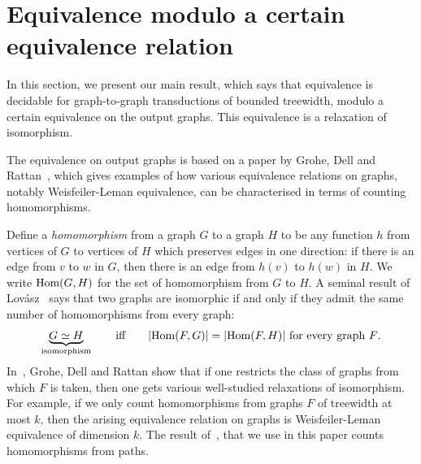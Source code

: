 
\section{Equivalence  modulo a certain equivalence relation}\label{sec:equivalence-modulo}
In this section, we present our main result, which says  that equivalence is decidable for graph-to-graph transductions of bounded treewidth, modulo a certain equivalence on the output graphs. This equivalence is a relaxation of isomorphism.  

 The equivalence on output graphs is based on a paper by Grohe, Dell and Rattan~\cite{groheDellRattan2018}, which gives examples of how various equivalence relations on graphs, notably Weisfeiler-Leman equivalence, can be characterised in terms of counting homomorphisms. 

Define a \emph{homomorphism} from a graph $G$ to a graph $H$ to be any function $h$ from vertices of $G$ to vertices of $H$ which preserves edges in one direction: if there is an edge from $v$ to $w$ in $G$, then there is an edge from $h(v)$ to $h(w)$ in $H$. We write $\mathrm {Hom}(G,H)$ for the set of homomorphism from $G$ to $H$. A seminal result of  Lov\'asz~\cite[p.~326]{lovasz1967operations} says that two graphs are isomorphic if and only if they admit the same number of homomorphisms from every graph:
\begin{align*}
\underbrace{G \simeq H}_{\text{isomorphism}} \qquad \text{iff} \qquad  |\mathrm {Hom}(F,G)|=|\mathrm {Hom}(F,H)| \ \text{for every graph $F$.}
\end{align*}
In~\cite{groheDellRattan2018},
Grohe, Dell and Rattan show that if one restricts the  class of graphs from which $F$ is taken, then one gets various well-studied relaxations of isomorphism. For example, if we only count homomorphisms from graphs $F$ of treewidth at most $k$, then the arising equivalence relation on graphs is Weisfeiler-Leman equivalence of dimension $k$.  The result of~\cite{groheDellRattan2018},  that we use in this paper counts homomorphisms from paths.

